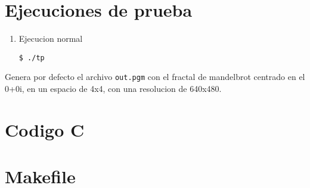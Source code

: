 \documentclass[10pt,spanish,a4paper,openany,notitlepage]{article}
\newcommand{\captionlisting}[2][]{%
}
\begin{document}
\section{Ejecuciones de prueba}

\begin{enumerate}
\item Ejecucion normal 
\begin{framed}
\begin{verbatim}$ ./tp \end{verbatim}
\end{framed}
\end{enumerate}

Genera por defecto el archivo \texttt{out.pgm} con el fractal de mandelbrot centrado en el 0+0i, en un espacio de 4x4, con una resolucion de 640x480.


\newpage
\appendix
\section{Codigo C}

\captionlisting{tp.c}

\newpage
\section{Makefile}



\newpage
\begin{thebibliography}{99} %


\end{thebibliography}
\end{document}
